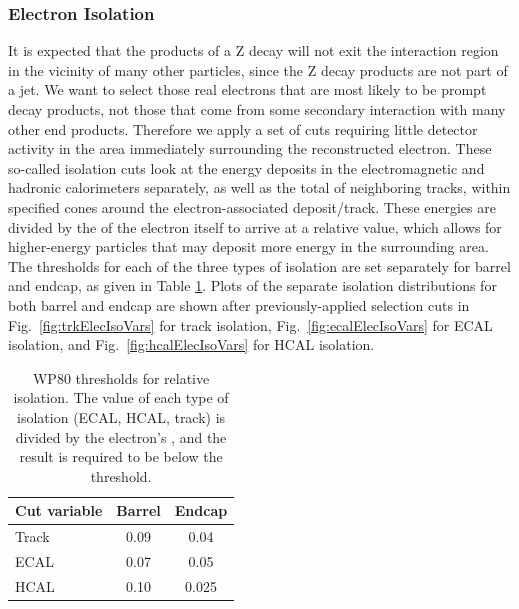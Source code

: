 \subsubsection{Electron Isolation}
\label{evSel:isol}
It is expected that the products of a Z decay will not 
exit the interaction region  
in the vicinity of many other particles, 
since the Z decay products are not part of a jet.
We want to select those real electrons that are most likely to be prompt decay products,
not those that come from some secondary interaction with many other end products.  
Therefore we apply a set of cuts requiring little detector activity 
in the area immediately surrounding the reconstructed electron.  
These so-called isolation cuts look at the energy deposits 
in the electromagnetic and hadronic calorimeters separately,
as well as the total \pt of neighboring tracks, 
within specified \DR cones around the electron-associated deposit/track.  
These energies are divided by the \pt of the electron itself to arrive at a relative value,
which allows for higher-energy particles that may deposit more energy in the surrounding area.  
The thresholds for each of the three types of isolation are set separately for barrel and endcap, 
as given in Table \ref{TableEisoCuts}.  
Plots of the separate isolation distributions for both barrel and endcap 
are shown after previously-applied selection cuts in 
Fig.~\ref{fig:trkElecIsoVars} for track isolation, 
Fig.~\ref{fig:ecalElecIsoVars} for ECAL isolation, and 
Fig.~\ref{fig:hcalElecIsoVars} for HCAL isolation.  




\begin{table}[htbp]
  \begin{center}
    \caption[WP80 thresholds for relative isolation]
    {\fixspacing WP80 thresholds for relative isolation.
    The value of each type of isolation (ECAL, HCAL, track) 
    is divided by the electron's \pt, and the result is 
    required to be below the threshold.  
    }
    \label{TableEisoCuts}
    \begin{tabular}[]{ | l | c | c | }
      \hline
      Cut variable & Barrel & Endcap  \\ \hline \hline
      Track & 0.09 & 0.04 \\ \hline
      ECAL & 0.07 & 0.05  \\ \hline
      HCAL & 0.10 & 0.025  \\ %
      \hline
    \end{tabular}
  \end{center}
\end{table}



